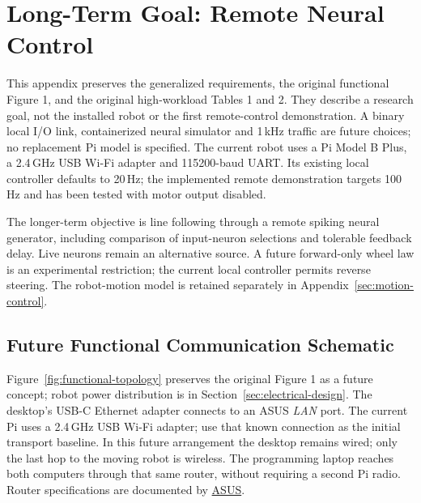 \clearpage
\section{Long-Term Goal: Remote Neural Control}
\label{app:long-term}
This appendix preserves the generalized requirements, the original functional Figure 1, and the original high-workload Tables 1 and 2. They describe a research goal, not the installed robot or the first remote-control demonstration. A binary local I/O link, containerized neural simulator and 1\,kHz traffic are future choices; no replacement Pi model is specified. The current robot uses a Pi Model B Plus, a 2.4\,GHz USB Wi-Fi adapter and 115200-baud UART. Its existing local controller defaults to 20\,Hz; the implemented remote demonstration targets 100\,Hz and has been tested with motor output disabled.

The longer-term objective is line following through a remote spiking neural generator, including comparison of input-neuron selections and tolerable feedback delay. Live neurons remain an alternative source. A future forward-only wheel law is an experimental restriction; the current local controller permits reverse steering. The robot-motion model is retained separately in Appendix~\ref{sec:motion-control}.

\subsection{Future Functional Communication Schematic}
Figure~\ref{fig:functional-topology} preserves the original Figure 1 as a future concept; robot power distribution is in Section~\ref{sec:electrical-design}. The desktop's USB-C Ethernet adapter connects to an ASUS \emph{LAN} port. The current Pi uses a 2.4\,GHz USB Wi-Fi adapter; use that known connection as the initial transport baseline. In this future arrangement the desktop remains wired; only the last hop to the moving robot is wireless. The programming laptop reaches both computers through that same router, without requiring a second Pi radio. Router specifications are documented by \href{https://dlcdnets.asus.com/pub/ASUS/wireless/RT-N56U/E7822_RT_N56U_Manual_English.pdf}{ASUS}.

